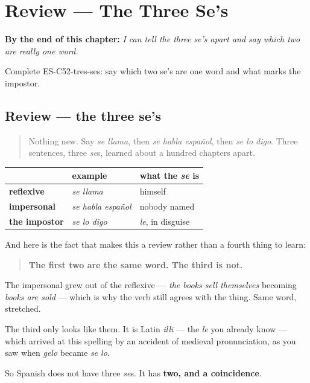 
\chapter{Review --- The Three Se's}
\label{ch:review-three-se}

\begin{chapteropening}
\textbf{By the end of this chapter:} \emph{I can tell the three se's apart and say which two are really one word.}

Complete ES-C52-tres-ses: say which two se's are one word and what marks the impostor.
\end{chapteropening}

\section[Practice]{Review — the three se's}

\label{lesson:ES-C52-tres-ses}



\begin{quote}
Nothing new. Say \emph{se llama}, then \emph{se habla español}, then \emph{se lo digo}. Three sentences, three \emph{se}s, learned about a hundred chapters apart.
\end{quote}

\begin{grammarlens}[title={What you've built}]
\noindent
\begin{tabularx}{\linewidth}{@{}>{\raggedright\arraybackslash}X>{\raggedright\arraybackslash}X>{\raggedright\arraybackslash}X@{}}
\toprule
\textbf{} & \textbf{example} & \textbf{what the \emph{se} is} \\
\midrule
\textbf{reflexive} & \emph{se llama} & himself \\
\textbf{impersonal} & \emph{se habla español} & nobody named \\
\textbf{the impostor} & \emph{se lo digo} & \emph{le}, in disguise \\
\bottomrule
\end{tabularx}

And here is the fact that makes this a review rather than a fourth thing to learn:

\begin{quote}
\textbf{The first two are the same word. The third is not.}
\end{quote}

The impersonal grew out of the reflexive — \emph{the books sell themselves} becoming \emph{books are sold} — which is why the verb still agrees with the thing. Same word, stretched.

The third only looks like them. It is Latin \emph{illī} — the \emph{le} you already know — which arrived at this spelling by an accident of medieval pronunciation, as you saw when \emph{gelo} became \emph{se lo}.

So Spanish does not have three \emph{se}s. It has \textbf{two, and a coincidence}.
\end{grammarlens}

